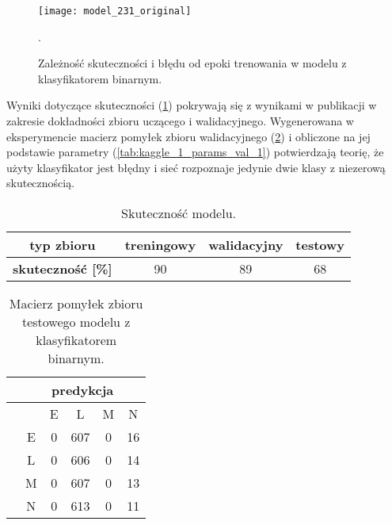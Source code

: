 {\begin{itemize}
\begin{figure}[h!]
	\centering
	\centering
		\texttt{[image: model\_231\_original]}	
	\caption{Zależność skuteczności i błędu od epoki trenowania w modelu z klasyfikatorem binarnym.}.
	\label{fig:kaggle_1_acc_loss_trening}
\end{figure}

Wyniki dotyczące skuteczności (\ref{tab:kaggle_1_acc}) pokrywają się z wynikami w publikacji w zakresie dokładności zbioru uczącego i walidacyjnego. Wygenerowana w eksperymencie macierz pomyłek zbioru walidacyjnego (\ref{tab:kaggle_1_conf_matrix_val_1}) i obliczone na jej podstawie parametry (\ref{tab:kaggle_1_params_val_1}) potwierdzają teorię, że użyty klasyfikator jest błędny i sieć rozpoznaje jedynie dwie klasy z niezerową skutecznością.

\begin{table}[h!]
\centering
\caption[Short Heading]{Skuteczność modelu.}
\label{tab:kaggle_1_acc}
\begin{tabular}{|c|c|c|c|}
\hline
\textbf{typ zbioru}           & \textbf{treningowy} & \textbf{walidacyjny} & \textbf{testowy} \\ \hline
\textbf{skuteczność {[}\%{]}} & 90                  & 89                   & 68               \\ \hline
\end{tabular}
\end{table}

\begin{table}[h!]
\centering
\caption[Short Heading]{Macierz pomyłek zbioru testowego modelu z klasyfikatorem binarnym.}
\label{tab:kaggle_1_conf_matrix_val_1}
\begin{tabular}{|c|c|c|c|c|c|}
\hline
\textbf{}                           & \multicolumn{5}{c|}{\textbf{predykcja}} \\ \hline
{\multirow{5}{*}{\rotatebox[origin=c]{90}{\textbf{klasa}}}} &         & E       & L        & M      & N       \\ \cline{2-6} 
                                    & E       & 0       & 607      & 0      & 16      \\ \cline{2-6} 
                                    & L       & 0       & 606      & 0      & 14      \\ \cline{2-6} 
                                    & M       & 0       & 607      & 0      & 13      \\ \cline{2-6} 
                                    & N       & 0       & 613      & 0      & 11       \\ \hline
\end{tabular}
\end{table}


\end{itemize}}
